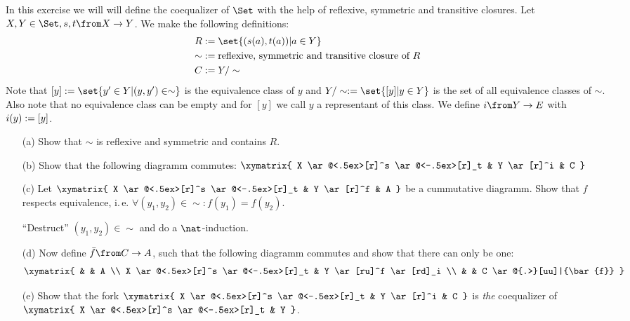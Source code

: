 \begin{exercise}
  In this exercise we will will define the coequalizer of $\Set$ with the help of reflexive, symmetric and transitive closures.
  Let $X, Y \in \Set, s, t \from X \to Y$.
  We make the following definitions:
  \begin{alignat*}{2}
    R    &:= \set{(s(a), t(a)) | a\in Y} \\
    \sim &:= \text{reflexive, symmetric and transitive closure of $R$} \\
    C    &:= Y / \sim
  \end{alignat*}
  Note that $\class{y} := \set{ y' \in Y | (y, y') \in \sim}$ is the equivalence class of $y$ and $Y / \sim := \set{ \class{y} | y \in Y}$ is the set of all equivalence classes of $\sim$.
  Also note that no equivalence class can be empty and for $[y]$ we call $y$ a representant of this class.
  We define $i \from Y \to E$ with $i(y) := [ y ]$.
  \begin{itemize}
    \item[(a)]Show that $\sim$ is reflexive and symmetric and contains $R$.
    \item[(b)]Show that the following diagramm commutes:
      $\xymatrix{
        X \ar@<.5ex>[r]^s \ar@<-.5ex>[r]_t & Y \ar[r]^i & C
      }$
    \item[(c)]Let
      $\xymatrix{
        X \ar@<.5ex>[r]^s \ar@<-.5ex>[r]_t & Y \ar[r]^f & A
      }$
      be a cummutative diagramm. Show that $f$ respects equivalence, i.\,e. $\forall (y_1, y_2) \in \sim: f(y_1) = f(y_2)$.
      \begin{hint}
        ``Destruct'' $(y_1, y_2) \in \sim$ and do a $\nat$-induction.
      \end{hint}
    \item[(d)]Now define $\bar{f} \from C \to A$, such that the following diagramm commutes and show that there can only be one:
      \[ \xymatrix{
        & & A  \\
        X \ar@<.5ex>[r]^s \ar@<-.5ex>[r]_t & Y \ar[ru]^f \ar[rd]_i \\
        & & C \ar@{.>}[uu]|{\bar{f}}
      } \]
    \item[(e)]Show that the fork
      $\xymatrix{
        X \ar@<.5ex>[r]^s \ar@<-.5ex>[r]_t & Y \ar[r]^i & C
      }$
      is \emph{the} coequalizer of
      $\xymatrix{
        X \ar@<.5ex>[r]^s \ar@<-.5ex>[r]_t & Y
      }$.
  \end{itemize}
\end{exercise}

